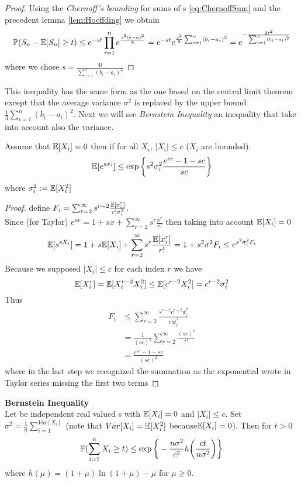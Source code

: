 \begin{proof}
	Using the \textit{Chernoff's bounding} for sums of \rv s  \ref{eq:ChernoffSum} and the precedent lemma \ref{lem:Hoeffding} we obtain
	$$\mathbb{P}(S_n-\mathbb{E}[S_n]\geq t)\leq e^{-st} \prod_{i=1}^{n}e^{\frac{s^2(b-a)^2}{8}}=e^{-st}e^{\frac{s^2}{8}\sum_{i=1}^{n}(b_i-a_i)^2}=e^{-\frac{2t^2}{\sum_{i=1}^{n}(b_i-a_i)^2}}$$
	where we chose $s=\frac{4t}{\sum_{i=1}^{n}(b_i-a_i)^2}$
\end{proof}

This inequality has the same form as the one based on the central limit theorem except that the average variance $\sigma^2$ is replaced by the upper bound $\frac{1}{4}\sum_{i=1}^{n}(b_i-a_i)^2$. Next we will see \textit{Bernstein Inequality} an inequality that take into account also the variance.\\

\begin{lem} \label{lem:Bernstain}
	Assume that $\mathbb{E}[X_i]=0$ then if for all $X_i$, $|X_i|\leq c$ ($X_i$ are bounded):
	$$\mathbb{E} [e^{sx_i}] \leq \exp\bigg\{ s^2\sigma^2_i \frac{e^{sc}-1-sc}{sc} \bigg\}$$
	where $\sigma_i^2:=\mathbb{E}[X_i^2]$
\end{lem}
\begin{proof}
	define $F_i=\sum_{r=2}^{\infty} s^{r-2} \frac{\mathbb{E} [x_i^r]}{r! \sigma_i^2 }$.\\
	Since (for Taylor) $e^{sx}=1+sx+\sum_{r=2}^{\infty} s^r\frac{x^r}{r!}$ then taking into account  $\mathbb{E}[X_i]=0$
	$$\mathbb{E}[s^{sX_i}]=1+s \mathbb{E} [X_i] + \sum_{r=2}^{\infty}s^r\frac{\mathbb{E} [x^r_i]}{r!}=1+s^2\sigma^2 F_i \leq e^{s^2\sigma_i^2F_i}$$
	Because we supposed $|X_i|\leq c$ for each index $r$ we have
	$$\mathbb{E}[X_i^r]= \mathbb{E} [X_i^{r-2}X_i^2] \leq \mathbb{E} [c^{r-2}X_i^2] = c^{r-2}\sigma_i^2$$
	Thus
	\[
	\begin{split}
	F_i
	& \leq \sum_{r=2}^{\infty}\frac{s^{r-2}c^{r-2} \not \sigma_i^2}{r! \not\sigma_i^2}\\
	& = \frac{1}{(sc)^2}\sum_{r=2}^{\infty}\frac{(sc)^{r}}{r!}\\
	&= \frac{e^{sc}-1-sc}{(sc)^2}
	\end{split}
	\]
	where in the last step we recognized the summation as the exponential wrote in Taylor series missing the first two terms
\end{proof}
\begin{teo}\textbf{Bernstein Inequality}\\
	Let \xii be independent real valued \rv s with $\mathbb{E}[X_i]=0$ and $|X_i|\leq c$. Set $\sigma^2=\frac{1}{n}\sum_{i=1}^{Var[X_i]}$ (note that $Var[X_i]=\mathbb{E}[X_i^2]$ because$\mathbb{E}[X_i]=0$). Then for $t>0$
	$$\mathbb{P}(\sum_{i=1}^{n}X_i\geq t)\leq \exp\bigg\{-\frac{n\sigma^2}{c^2} h\bigg(\frac{ct}{n\sigma^2} \bigg)\bigg\}$$
	where $h(\mu)=(1+\mu)\ln(1+\mu)-\mu$ for $\mu \geq 0$.
\end{teo}

